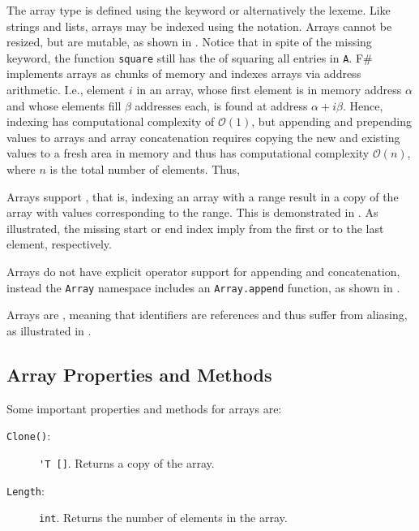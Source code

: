 \documentclass[fsharpnotes.tex]{subfiles}
\begin{document}
The array type is defined using the  keyword or alternatively the \lexeme{[]} lexeme.  Like strings and lists, arrays may be indexed using the  notation. Arrays cannot be resized, but are mutable, as shown in .
%
%
Notice that in spite of the missing  keyword, the function \lstinline{square} still has the  of squaring all entries in \lstinline{A}.  F\# implements arrays as chunks of memory and indexes arrays via address arithmetic. I.e., element $i$ in an array, whose first element is in memory address $\alpha$ and whose elements fill $\beta$ addresses each, is found at address $\alpha+i\beta$. Hence, indexing has computational complexity of $\mathcal{O}(1)$, but appending and prepending values to arrays and array concatenation requires copying the new and existing values to a fresh area in memory and thus has computational complexity $\mathcal{O}(n)$, where $n$ is the total number of elements. Thus, 

Arrays support , that is, indexing an array with a range result in a copy of the array with values corresponding to the range. This is demonstrated in .
%
%
As illustrated, the missing start or end index imply from the first or to the last element, respectively.

Arrays do not have explicit operator support for appending and concatenation, instead the \lstinline{Array} namespace includes an \lstinline{Array.append} function, as shown in .
%
%

Arrays are , meaning that identifiers are references and thus suffer from aliasing, as illustrated in .
%
%

\subsection{Array Properties and Methods}
\label{sec:arrayMethods}
Some important properties and methods for arrays are:
\begin{description}
\item[\texttt{Clone()}:] \lstinline{'T []}. Returns a copy of the array.
\item[\texttt{Length}:] \lstinline{int}. Returns the number of elements in the array.
\end{description}
\end{document}
